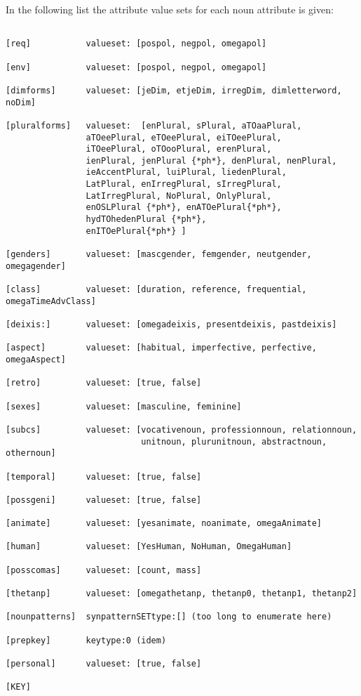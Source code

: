 In the following  list the attribute value sets for each 
noun attribute is given:
\begin{verbatim}

[req]           valueset: [pospol, negpol, omegapol]   

[env]           valueset: [pospol, negpol, omegapol]   

[dimforms]      valueset: [jeDim, etjeDim, irregDim, dimletterword, noDim]

[pluralforms]   valueset:  [enPlural, sPlural, aTOaaPlural, 
                aTOeePlural, eTOeePlural, eiTOeePlural,
                iTOeePlural, oTOooPlural, erenPlural, 
                ienPlural, jenPlural {*ph*}, denPlural, nenPlural,
                ieAccentPlural, luiPlural, liedenPlural, 
                LatPlural, enIrregPlural, sIrregPlural,
                LatIrregPlural, NoPlural, OnlyPlural,
                enOSLPlural {*ph*}, enATOePlural{*ph*}, 
                hydTOhedenPlural {*ph*},
                enITOePlural{*ph*} ]

[genders]       valueset: [mascgender, femgender, neutgender, omegagender]

[class]         valueset: [duration, reference, frequential, omegaTimeAdvClass]
 
[deixis:]       valueset: [omegadeixis, presentdeixis, pastdeixis]

[aspect]        valueset: [habitual, imperfective, perfective, omegaAspect]

[retro]         valueset: [true, false]

[sexes]         valueset: [masculine, feminine]

[subcs]         valueset: [vocativenoun, professionnoun, relationnoun,
                           unitnoun, plurunitnoun, abstractnoun, othernoun]

[temporal]      valueset: [true, false]

[possgeni]      valueset: [true, false]

[animate]       valueset: [yesanimate, noanimate, omegaAnimate]

[human]         valueset: [YesHuman, NoHuman, OmegaHuman]

[posscomas]     valueset: [count, mass]

[thetanp]       valueset: [omegathetanp, thetanp0, thetanp1, thetanp2] 

[nounpatterns]  synpatternSETtype:[] (too long to enumerate here)

[prepkey]       keytype:0 (idem)

[personal]      valueset: [true, false]

[KEY]

\end{verbatim}

